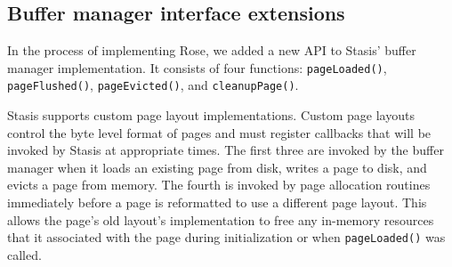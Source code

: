 \documentclass{vldb}
\newcommand{\rows}{Rose\xspace}
\newcommand{\rowss}{Rose's\xspace}
\begin{document}



\subsection{Buffer manager interface extensions}

In the process of implementing \rows, we added a new API to
Stasis' buffer manager implementation.  It consists of four
functions: {\tt pageLoaded()}, {\tt pageFlushed()}, {\tt pageEvicted()},
and {\tt cleanupPage()}.

Stasis supports custom page layout implementations.  Custom page
layouts control the byte level format of pages and must register
callbacks that will be invoked by Stasis at appropriate times.  The
first three are invoked by the buffer manager when it loads an
existing page from disk, writes a page to disk, and evicts a page
from memory.  The fourth is invoked by page allocation
routines immediately before a page is reformatted to use a different
page layout.  This allows the page's old layout's implementation to
free any in-memory resources that it associated with the page during
initialization or when {\tt pageLoaded()} was called.

\end{document}
